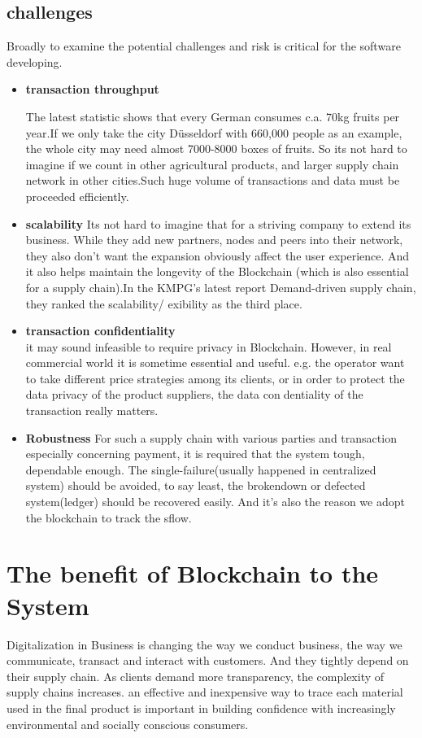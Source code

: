 \subsection{challenges}
Broadly to examine the potential challenges and risk is critical for the software developing.
\begin{itemize}
	\item \textbf{transaction throughput}
	
		The latest statistic shows that every German consumes c.a. 70kg fruits per year.If we only take the city Düsseldorf with 660,000 people as an example, the whole city may need almost 7000-8000 boxes of fruits. So its not hard to imagine if we count in other agricultural products, and larger supply chain network in other cities.Such huge volume of transactions and data must be proceeded efficiently.
	\item \textbf{scalability}
		Its not hard to imagine that for a striving company to extend its business. While they add new partners,
		nodes and peers into their network, they also don't want the expansion obviously affect the user experience. And it also helps maintain the longevity of the Blockchain (which is also essential for a supply chain).In the KMPG's latest report Demand-driven supply chain, they ranked the scalability/
exibility as the third place.
		
	\item \textbf{transaction confidentiality}\\
		it may sound infeasible to require privacy in Blockchain. However,
		in real commercial world it is sometime essential and useful. e.g. the operator want to
		take different price strategies among its clients, or in order to protect the data privacy of the product suppliers, the data condentiality of the transaction really matters.
	\item \textbf{Robustness}
		For such a supply chain with various parties and transaction especially concerning payment, it is required that the system tough, dependable enough. The single-failure(usually happened in centralized system) should be avoided, to say least, the brokendown or defected system(ledger) should be recovered easily. And it's also the reason we adopt the blockchain to track the sflow.
\end{itemize}


\section{The benefit of Blockchain to the System}
Digitalization in Business is changing the way we conduct business, the way we communicate, transact and interact with customers. And they tightly depend on their supply chain. As clients demand more
transparency, the complexity of supply chains increases.
an effective and inexpensive way to trace each material used
in the final product is important in building confidence with
increasingly environmental and socially conscious consumers.

